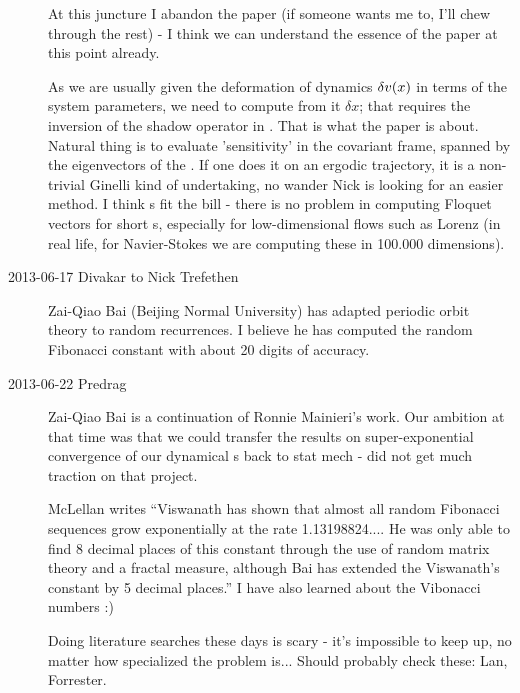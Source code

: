 \begin{description}
At this juncture I abandon the paper (if someone wants me to, I'll chew
through the rest) - I think we can understand  the essence of the
paper at this point already.

As we are usually given the deformation of dynamics $\delta
v(x)$ in terms of the system parameters, we need to compute from
it $\delta x$; that requires the inversion of the  shadow operator in
. That is what the paper is about. Natural thing is to
evaluate 'sensitivity' in the covariant frame, spanned by
the eigenvectors of the \JacobianM.
If one does
it on an ergodic trajectory, it is a non-trivial
Ginelli \etal{} kind of undertaking, no wander Nick
is looking for an easier method. I think \po s fit the bill - there
is no problem in computing Floquet vectors for short \po s,
especially for low-dimensional flows such as Lorenz (in real life,
for Navier-Stokes we are computing these in 100.000 dimensions).

\item[2013-06-17 Divakar to Nick Trefethen]
Zai-Qiao Bai (Beijing Normal University) has adapted periodic orbit
theory to random recurrences. I believe he has
computed the random Fibonacci constant with about 20 digits of
accuracy.

\item[2013-06-22 Predrag]
Zai-Qiao Bai is a continuation of Ronnie
Mainieri's work. Our ambition at that
time was that we could transfer the results on super-exponential
convergence of our dynamical \Fd s back to stat mech - did not
get much traction on that project.

McLellan writes ``Viswanath has shown that almost all
random Fibonacci sequences grow exponentially at the rate
1.13198824.... He was only able to find 8 decimal places of this
constant through the use of random matrix theory and a fractal
measure, although Bai has extended the Viswanath's constant by 5
decimal places.'' I have also learned about the Vibonacci numbers :)

Doing literature searches these days is scary - it's impossible to keep up,
no matter how specialized the problem is... Should probably check these:
Lan,
Forrester.



\end{description}
